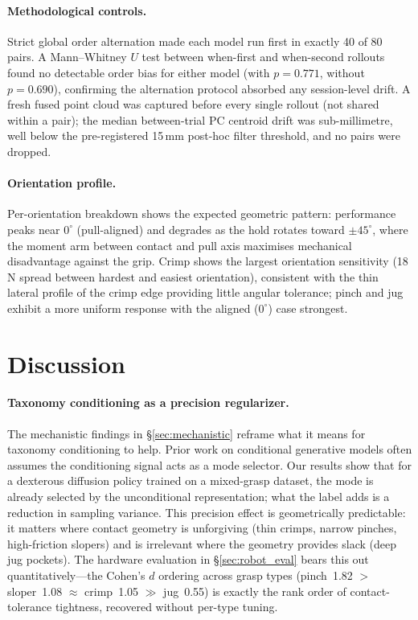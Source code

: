 \documentclass[11pt]{article}
\begin{document}
\paragraph{Methodological controls.}
Strict global order alternation made each model run first in exactly 40 of 80 pairs.
A Mann--Whitney $U$ test between when-first and when-second rollouts found no
detectable order bias for either model (with $p = 0.771$, without $p = 0.690$),
confirming the alternation protocol absorbed any session-level drift. A fresh fused
point cloud was captured before every single rollout (not shared within a pair); the
median between-trial PC centroid drift was sub-millimetre, well below the
pre-registered 15\,mm post-hoc filter threshold, and no pairs were dropped.

\paragraph{Orientation profile.}
Per-orientation breakdown shows the expected geometric pattern: performance peaks near
$0^\circ$ (pull-aligned) and degrades as the hold rotates toward $\pm 45^\circ$, where
the moment arm between contact and pull axis maximises mechanical disadvantage against
the grip. Crimp shows the largest orientation sensitivity (18\,N spread between
hardest and easiest orientation), consistent with the thin lateral profile of the
crimp edge providing little angular tolerance; pinch and jug exhibit a more uniform
response with the aligned ($0^\circ$) case strongest.

\section{Discussion}
\label{sec:discussion}
\paragraph{Taxonomy conditioning as a precision regularizer.}
The mechanistic findings in \S\ref{sec:mechanistic} reframe what it means for taxonomy
conditioning to help. Prior work on conditional generative models often assumes the
conditioning signal acts as a mode selector. Our results show that for a dexterous
diffusion policy trained on a mixed-grasp dataset, the mode is already selected by the
unconditional representation; what the label adds is a reduction in sampling variance.
This precision effect is geometrically predictable: it matters where contact geometry is
unforgiving (thin crimps, narrow pinches, high-friction slopers) and is irrelevant where
the geometry provides slack (deep jug pockets). The hardware evaluation in
\S\ref{sec:robot_eval} bears this out quantitatively---the Cohen's $d$ ordering across
grasp types (pinch~1.82 $>$ sloper~1.08 $\approx$ crimp~1.05 $\gg$ jug~0.55) is exactly
the rank order of contact-tolerance tightness, recovered without per-type tuning.
\end{document}
